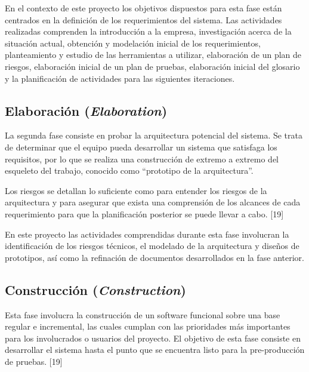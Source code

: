 En el contexto de este proyecto los objetivos dispuestos para esta
fase están centrados en la definición de los requerimientos del sistema.
Las actividades realizadas comprenden la introducción a la empresa,
investigación acerca de la situación actual, obtención y modelación
inicial de los requerimientos, planteamiento y estudio de las herramientas
a utilizar, elaboración de un plan de riesgos, elaboración inicial
de un plan de pruebas, elaboración inicial del glosario y la planificación
de actividades para las siguientes iteraciones. 


\subsection{Elaboración (\textit{Elaboration})}

La segunda fase consiste en probar la arquitectura potencial del sistema.
Se trata de determinar que el equipo pueda desarrollar un sistema
que satisfaga los requisitos, por lo que se realiza una construcción
de extremo a extremo del esqueleto del trabajo, conocido como \textquotedblleft{}prototipo
de la arquitectura\textquotedblright{}. 

Los riesgos se detallan lo suficiente como para entender los riesgos
de la arquitectura y para asegurar que exista una comprensión de los
alcances de cada requerimiento para que la planificación posterior
se puede llevar a cabo. {[}19{]}

En este proyecto las actividades comprendidas durante esta fase involucran
la identificación de los riesgos técnicos, el modelado de la arquitectura
y diseños de prototipos, así como la refinación de documentos desarrollados
en la fase anterior. 


\subsection{Construcción (\textit{Construction})}

Esta fase involucra la construcción de un software funcional sobre
una base regular e incremental, las cuales cumplan con las prioridades
más importantes para los involucrados o usuarios del proyecto. El
objetivo de esta fase consiste en desarrollar el sistema hasta el
punto que se encuentra listo para la pre-producción de pruebas. {[}19{]} 

